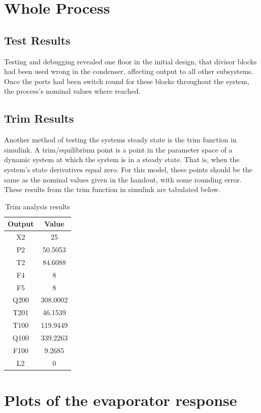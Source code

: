 \documentclass[11pt]{article}
\begin{document}
\section{Whole Process}
\subsection{Test Results}
Testing and debugging revealed one floor in the initial design, that divisor blocks had been used wrong in the condenser, affecting output to all other subsystems. Once the ports had been switch round for these blocks throughout the system, the process's nominal values where reached. 

\subsection{Trim Results}
Another method of testing the systems steady state is the trim function in simulink. A trim/equilibrium point is a point in the parameter space of a dynamic system at which the system is in a steady state. That is, when the system's state derivatives equal zero. For this model, these points should be the same as the nominal values given in the handout, with some rounding error. These results from the trim function in simulink are tabulated below.
\begin{table}[H]
\centering
\label{my-label}
\begin{tabular}{|cc|}
\hline
Output & Value    \\ \hline
X2     & 25       \\
P2     & 50.5053  \\
T2     & 84.6088  \\
F4     & 8        \\
F5     & 8        \\
Q200   & 308.0002 \\
T201   & 46.1539  \\
T100   & 119.9449 \\
Q100   & 339.2263 \\
F100   & 9.2685   \\
L2     & 0        \\ \hline
\end{tabular}
\caption{Trim analysis results}
\end{table}

\appendix
\section{Plots of the evaporator response}
\end{document}
